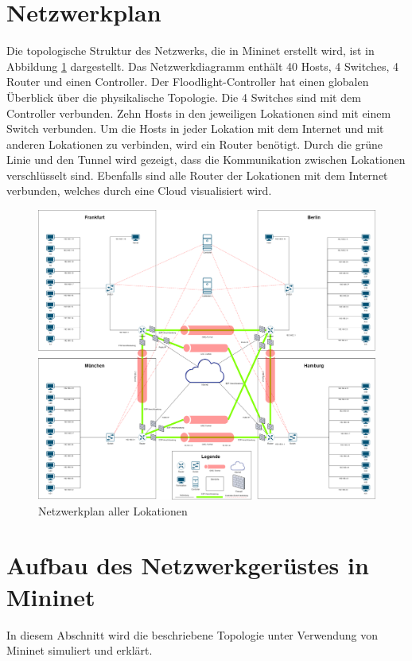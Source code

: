 \documentclass[fontsize=12pt,paper=a4,open=any,parskip=half,
  twoside=false,toc=listof,toc=bibliography,fleqn,leqno,
  captions=nooneline,captions=tableabove,british]{scrbook}
\begin{document}
\section{Netzwerkplan}
Die topologische Struktur des Netzwerks, die in Mininet erstellt wird, ist in Abbildung \ref{netzwerkplan} dargestellt. Das Netzwerkdiagramm enthält 40 Hosts, 4 Switches, 4 Router und einen Controller. Der Floodlight-Controller hat einen globalen Überblick über die physikalische Topologie. Die 4 Switches sind mit dem Controller verbunden. Zehn Hosts in den jeweiligen Lokationen sind mit einem Switch verbunden. Um die Hosts in jeder Lokation mit dem Internet und mit anderen Lokationen zu verbinden, wird ein Router benötigt. Durch die grüne Linie und den Tunnel wird gezeigt, dass die Kommunikation zwischen Lokationen verschlüsselt sind. Ebenfalls sind alle Router der Lokationen mit dem Internet verbunden, welches durch eine Cloud visualisiert wird.

\begin{figure}[H]
 \centering
 \includegraphics[width=1.0\textwidth]{Bilder/netzwerkplan}
 \captionsetup{justification=centering,margin=1cm}
 \caption{Netzwerkplan aller Lokationen}
 \label{netzwerkplan}
\end{figure}

\section{Aufbau des Netzwerkgerüstes in Mininet}
In diesem Abschnitt wird die beschriebene Topologie unter Verwendung von Mininet simuliert und erklärt.
\end{document}
